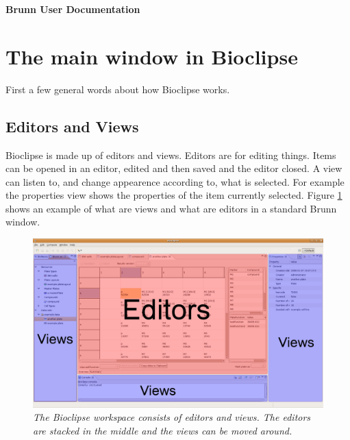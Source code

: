 \documentclass[a4paper,10pt]{article}
\begin{document}
    \huge 
    \noindent
    \textbf{Brunn User Documentation}

    \normalsize

    \section{The main window in Bioclipse}
        First a few general words about how Bioclipse works.

        \subsection{Editors and Views}
            Bioclipse is made up of editors and views. Editors are for editing
            things. Items can be opened in an editor, edited and then saved and
            the editor closed. A view can listen to, and change appearence
            according to, what is selected. For example the properties view
            shows the properties of the item currently selected. Figure
            \ref{editorsAndViews} shows an example of what are views and what
            are editors in a standard Brunn window.
            
            \begin{figure}[htbp]
                \begin{center}
                    \includegraphics[width=1\textwidth]{images/EditorsViews.png}
                \end{center}
                \caption{\textit{The Bioclipse workspace consists of editors
                                 and views. The editors are stacked in the
                                 middle and the views can be moved around.}}
                \label{editorsAndViews}
            \end{figure}
\end{document}
